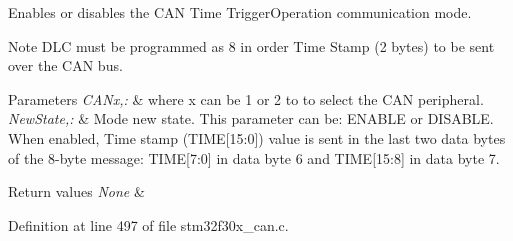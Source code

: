 Enables or disables the C\-A\-N Time Trigger\-Operation communication mode. 

\begin{DoxyNote}{Note}
D\-L\-C must be programmed as 8 in order Time Stamp (2 bytes) to be sent over the C\-A\-N bus. 
\end{DoxyNote}

\begin{DoxyParams}{Parameters}
{\em C\-A\-Nx,\-:} & where x can be 1 or 2 to to select the C\-A\-N peripheral. \\
\hline
{\em New\-State,\-:} & Mode new state. This parameter can be\-: E\-N\-A\-B\-L\-E or D\-I\-S\-A\-B\-L\-E. When enabled, Time stamp (T\-I\-M\-E\mbox{[}15\-:0\mbox{]}) value is sent in the last two data bytes of the 8-\/byte message\-: T\-I\-M\-E\mbox{[}7\-:0\mbox{]} in data byte 6 and T\-I\-M\-E\mbox{[}15\-:8\mbox{]} in data byte 7. \\
\hline
\end{DoxyParams}

\begin{DoxyRetVals}{Return values}
{\em None} & \\
\hline
\end{DoxyRetVals}


Definition at line 497 of file stm32f30x\-\_\-can.\-c.


